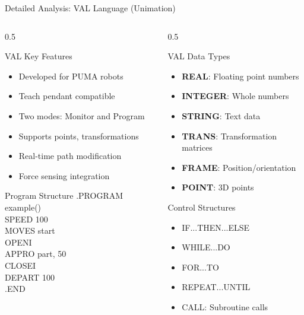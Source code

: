 \documentclass[10pt,aspectratio=169]{beamer}
\begin{document}
\begin{frame}{Detailed Analysis: VAL Language (Unimation)}
\begin{columns}[T]
\begin{column}{0.5\textwidth}
\begin{block}{VAL Key Features}
\begin{itemize}
\item Developed for PUMA robots
\item Teach pendant compatible
\item Two modes: Monitor and Program
\item Supports points, transformations
\item Real-time path modification
\item Force sensing integration
\end{itemize}
\end{block}
\begin{exampleblock}{Program Structure}
\ttfamily
.PROGRAM example()\\
\quad SPEED 100\\
\quad MOVES start\\
\quad OPENI\\
\quad APPRO part, 50\\
\quad CLOSEI\\
\quad DEPART 100\\
.END
\end{exampleblock}
\end{column}
\begin{column}{0.5\textwidth}
\begin{block}{VAL Data Types}
\begin{itemize}
\item \textbf{REAL}: Floating point numbers
\item \textbf{INTEGER}: Whole numbers
\item \textbf{STRING}: Text data
\item \textbf{TRANS}: Transformation matrices
\item \textbf{FRAME}: Position/orientation
\item \textbf{POINT}: 3D points
\end{itemize}
\end{block}
\begin{block}{Control Structures}
\begin{itemize}
\item IF...THEN...ELSE
\item WHILE...DO
\item FOR...TO
\item REPEAT...UNTIL
\item CALL: Subroutine calls
\end{itemize}
\end{block}
\end{column}
\end{columns}
\end{frame}
\end{document}
